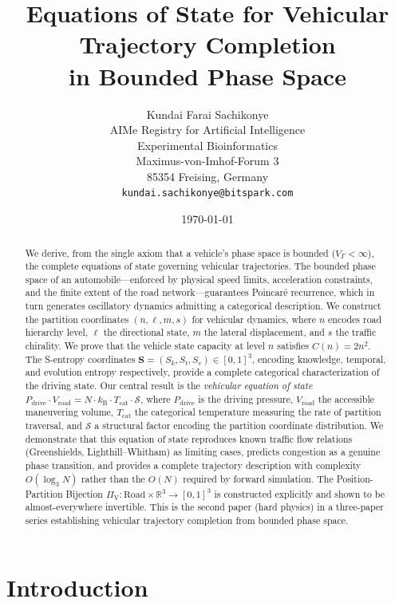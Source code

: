 \documentclass[twocolumn,10pt]{article}
\title{Equations of State for Vehicular Trajectory Completion\\in Bounded Phase Space}
\author{
Kundai Farai Sachikonye\\
AIMe Registry for Artificial Intelligence\\
Experimental Bioinformatics\\
Maximus-von-Imhof-Forum 3\\
85354 Freising, Germany\\
\texttt{kundai.sachikonye@bitspark.com}
}
\date{\today}
\newcommand{\kB}{k_{\mathrm{B}}}
\newcommand{\Tcat}{T_{\mathrm{cat}}}
\newcommand{\Pdrive}{P_{\mathrm{drive}}}
\newcommand{\Vroad}{V_{\mathrm{road}}}
\newcommand{\VGamma}{V_{\Gamma}}
\newcommand{\PiV}{\Pi_{\mathrm{V}}}
\newcommand{\Sk}{S_k}
\newcommand{\St}{S_t}
\newcommand{\Se}{S_e}
\begin{document}
\maketitle

\begin{abstract}
We derive, from the single axiom that a vehicle's phase space is bounded ($\VGamma < \infty$), the complete equations of state governing vehicular trajectories. The bounded phase space of an automobile---enforced by physical speed limits, acceleration constraints, and the finite extent of the road network---guarantees Poincar\'{e} recurrence, which in turn generates oscillatory dynamics admitting a categorical description. We construct the partition coordinates $(n, \ell, m, s)$ for vehicular dynamics, where $n$ encodes road hierarchy level, $\ell$ the directional state, $m$ the lateral displacement, and $s$ the traffic chirality. We prove that the vehicle state capacity at level $n$ satisfies $C(n) = 2n^2$. The S-entropy coordinates $\mathbf{S} = (\Sk, \St, \Se) \in [0,1]^3$, encoding knowledge, temporal, and evolution entropy respectively, provide a complete categorical characterization of the driving state. Our central result is the \emph{vehicular equation of state} $\Pdrive \cdot \Vroad = N \cdot \kB \cdot \Tcat \cdot \mathcal{S}$, where $\Pdrive$ is the driving pressure, $\Vroad$ the accessible maneuvering volume, $\Tcat$ the categorical temperature measuring the rate of partition traversal, and $\mathcal{S}$ a structural factor encoding the partition coordinate distribution. We demonstrate that this equation of state reproduces known traffic flow relations (Greenshields, Lighthill--Whitham) as limiting cases, predicts congestion as a genuine phase transition, and provides a complete trajectory description with complexity $O(\log_3 N)$ rather than the $O(N)$ required by forward simulation. The Position-Partition Bijection $\PiV: \mathrm{Road} \times \mathbb{R}^3 \to [0,1]^3$ is constructed explicitly and shown to be almost-everywhere invertible. This is the second paper (hard physics) in a three-paper series establishing vehicular trajectory completion from bounded phase space.
\end{abstract}

\section{Introduction}\label{sec:introduction}
\end{document}
